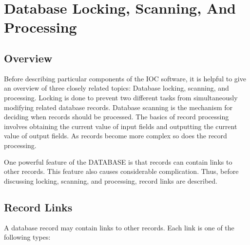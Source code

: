 \chapter{Database Locking, Scanning, And Processing}

\section{Overview}

Before describing particular components of the IOC software, it is helpful to give an overview of three closely related topics: Database locking, scanning, and processing.
Locking is done to prevent two different tasks from simultaneously modifying related database records.
Database scanning is the mechanism for deciding when records should be processed.
The basics of record processing involves obtaining the current value of input fields and outputting the current value of output fields.
As records become more complex so does the record processing.

One powerful feature of the DATABASE is that records can contain links to other records.
This feature also causes considerable complication.
Thus, before discussing locking, scanning, and processing, record links are described.

\section{Record Links}

A database record may contain links to other records.
Each link is one of the following types:

